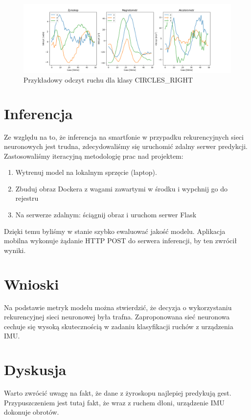 \documentclass[10pt]{article}
\begin{document}
\begin{figure}[H]
  \includegraphics[width=16cm]{sample.png}
  \centering
  \caption{Przykładowy odczyt ruchu dla klasy CIRCLES\_RIGHT}
\end{figure}

\section{Inferencja}

Ze względu na to, że inferencja na smartfonie w przypadku rekurencyjnych sieci neuronowych jest trudna, zdecydowaliśmy się uruchomić zdalny serwer predykcji. Zastosowaliśmy iteracyjną metodologię prac nad projektem: 

\begin{enumerate}
  \item Wytrenuj model na lokalnym sprzęcie (laptop).
  \item Zbuduj obraz Dockera z wagami zawartymi w środku i wypchnij go do rejestru
  \item Na serwerze zdalnym: ściągnij obraz i uruchom serwer Flask
\end{enumerate}

Dzięki temu byliśmy w stanie szybko ewaluować jakość modelu. Aplikacja mobilna wykonuje żądanie HTTP POST do serwera inferencji, by ten zwrócił wyniki.

\section{Wnioski}

Na podstawie metryk modelu można stwierdzić, że decyzja o wykorzystaniu rekurencyjnej sieci neuronowej była trafna. Zaproponowana sieć neuronowa cechuje się wysoką skutecznością w zadaniu klasyfikacji ruchów z urządzenia IMU.

\section{Dyskusja}

Warto zwrócić uwagę na fakt, że dane z żyroskopu najlepiej predykują gest. Przypuszczeniem jest tutaj fakt, że wraz z ruchem dłoni, urządzenie IMU dokonuje obrotów.
\end{document}

